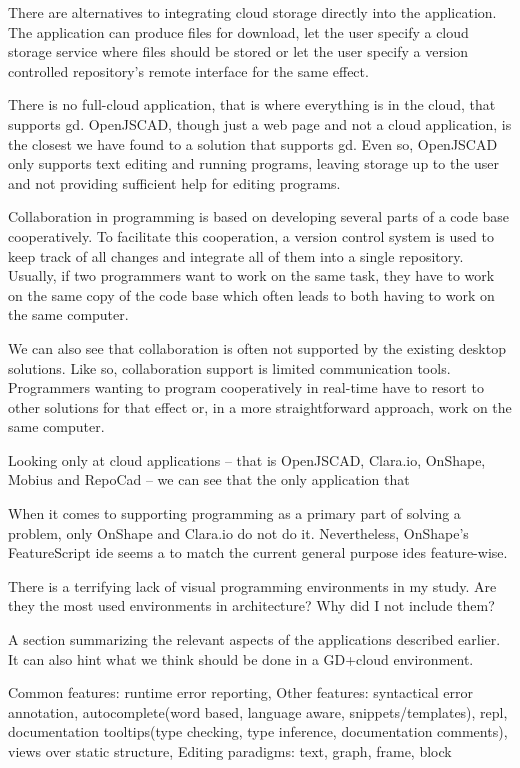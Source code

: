 There are alternatives to integrating cloud storage directly into the application.
The application can produce files for download, let the user specify a cloud storage service where files should be stored or let the user specify a version controlled repository's remote interface for the same effect.

There is no full-cloud application, that is where everything is in the cloud, that supports \gls{gd}.
OpenJSCAD, though just a web page and not a cloud application, is the closest we have found to a solution that supports \gls{gd}.
Even so, OpenJSCAD only supports text editing and running programs, leaving storage up to the user and not providing sufficient help for editing programs.


Collaboration in programming is based on developing several parts of a code base cooperatively.
To facilitate this cooperation, a version control system is used to keep track of all changes and integrate all of them into a single repository.
Usually, if two programmers want to work on the same task, they have to work on the same copy of the code base which often leads to both having to work on the same computer.

We can also see that collaboration is often not supported by the existing desktop solutions.
Like so, collaboration support is limited communication tools.
Programmers wanting to program cooperatively in real-time have to resort to other solutions for that effect or, in a more straightforward approach, work on the same computer.


Looking only at cloud applications -- that is OpenJSCAD, Clara.io, OnShape, Mobius and RepoCad -- we can see that the only application that


When it comes to supporting programming as a primary part of solving a problem, only OnShape and Clara.io do not do it.
Nevertheless, OnShape's FeatureScript \gls{ide} seems a to match the current general purpose \glspl{ide} feature-wise.

\noindent{\rule{\textwidth}{0.4pt}}

There is a terrifying lack of visual programming environments in my study.
Are they the most used environments in architecture?
Why did I not include them?

A section summarizing the relevant aspects of the applications described earlier.
It can also hint what we think should be done in a GD+cloud environment.

Common features: runtime error reporting,
Other features: syntactical error annotation, autocomplete(word based, language aware, snippets/templates), repl, documentation tooltips(type checking, type inference, documentation comments), views over static structure,
Editing paradigms: text, graph, frame, block

